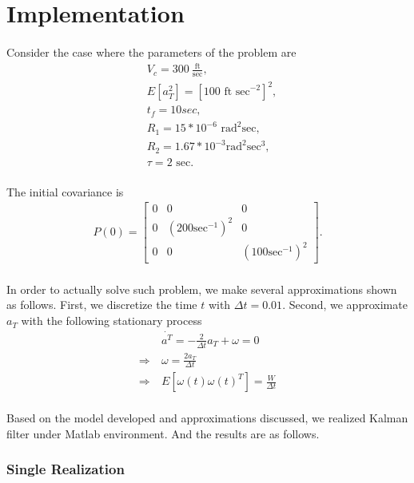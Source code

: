 \section{Implementation}
\paragraph{}
Consider the case where the parameters of the problem are
\begin{align*}
&V_c = 300\ \frac{\text{ft}}{\text{sec}}, \\
&E[a_T^2] = {[100 \text{ ft sec}^{-2}]}^2,\\
&t_f =10 sec, \\
&R_1 = 15*10^{-6} \text{ rad}^2\text{sec},\\
&R_2 = 1.67*10^{-3} \text{rad}^2\text{sec}^3,\\
&\tau = 2 \text{ sec}.
\end{align*}
\paragraph{}
The initial covariance is
\begin{align*}
	P(0) = \begin{bmatrix}
	0&0&0\\0&{(200\text{sec}^{-1})}^2&0\\0&0&{(100\text{sec}^{-1})}^2
	\end{bmatrix}.
\end{align*}
\paragraph{}
In order to actually solve such problem, we make several approximations shown as follows. First, we discretize the time $t$ with $\Delta t =0.01$. Second, we approximate $a_T$ with the following stationary process
\begin{align*}
&\dot{a^T} = -\frac{2}{\Delta t}a_T + \omega = 0 \\
\Rightarrow\ & \omega = \frac{2a_T}{\Delta t}\\
\Rightarrow\ & E[\omega(t)\omega(t)^T] = \frac{W}{\Delta t}
\end{align*}
\paragraph{}
Based on the model developed and approximations discussed, we realized Kalman filter under Matlab environment. And the results are as follows.
\subsubsection{Single Realization}
